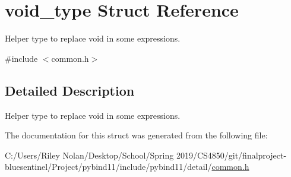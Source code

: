 \hypertarget{structvoid__type}{}\section{void\+\_\+type Struct Reference}
\label{structvoid__type}


Helper type to replace \textquotesingle{}void\textquotesingle{} in some expressions.  




{\ttfamily \#include $<$common.\+h$>$}



\subsection{Detailed Description}
Helper type to replace \textquotesingle{}void\textquotesingle{} in some expressions. 

The documentation for this struct was generated from the following file\+:\begin{DoxyCompactItemize}
\item 
C\+:/\+Users/\+Riley Nolan/\+Desktop/\+School/\+Spring 2019/\+C\+S4850/git/finalproject-\/bluesentinel/\+Project/pybind11/include/pybind11/detail/\mbox{\hyperlink{detail_2common_8h}{common.\+h}}\end{DoxyCompactItemize}
